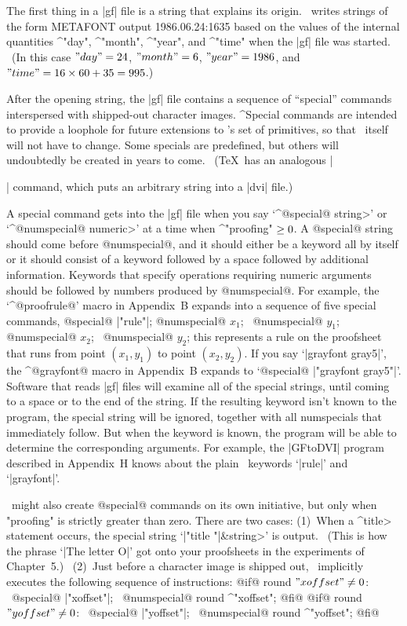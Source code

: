 \smallskip
The first thing in a |gf| file is a string that explains its origin.
\MF\ writes strings of the form
\begintt
METAFONT output 1986.06.24:1635
\endtt
based on the values of the internal quantities ^"day", ^"month",
^"year", and ^"time" when the |gf| file was started. \ (In this case
$"day"=24$, $"month"=6$, $"year"=1986$, %
and $"time"=16\times60+35=995$.)

After the opening string, the |gf| file contains a sequence of
``special'' commands interspersed with shipped-out character images.
^{Special commands} are intended to provide a loophole for future
extensions to \MF's set of primitives, so that \MF\ itself will not
have to change. Some specials are predefined, but others will
undoubtedly be created in years to come. \ (\TeX\ has an analogous
|\special| command, which puts an arbitrary string into a |dvi| file.)

A special command gets into the |gf| file when you say `^@special@
\<string>' or `^@numspecial@ \<numeric>' at a time when
^"proofing"$\null\ge0$.  A @special@ string should come before
@numspecial@, and it
should either be a keyword all by itself or it should consist of a keyword
followed by a space followed by additional information. Keywords that
specify operations requiring numeric arguments should be followed by
numbers produced by @numspecial@. For example, the `^@proofrule@' macro
in Appendix~B expands into a sequence of five special commands,
\begindisplay
@special@ |"rule"|;\cr
@numspecial@ $x_1$; \ @numspecial@ $y_1$;\cr
@numspecial@ $x_2$; \ @numspecial@ $y_2$;\cr
\enddisplay
this represents a rule on the proofsheet that runs from point $(x_1,y_1)$
to point $(x_2,y_2)$. If you say `|grayfont gray5|', the ^@grayfont@
macro in Appendix~B expands to `@special@ |"grayfont gray5"|'.
Software that reads |gf| files will examine all of the special strings,
until coming to a space or to the end of the string. If the resulting
keyword isn't known to the program, the special string will be ignored,
together with all numspecials that immediately follow. But when the
keyword is known, the program will be able to determine the corresponding
arguments.  For example, the |GFtoDVI| program described in Appendix~H
knows about the plain \MF\ keywords `|rule|' and `|grayfont|'.

\MF\ might also create @special@ commands on its own initiative, but only
when "proofing" is strictly greater than zero. There are
two cases: (1)~When a ^\<title> statement occurs,
the special string `|"title "|\thinspace\&\thinspace\<string>'
is output. \ (This is how the phrase `|The letter O|' got onto your
proofsheets in the experiments of Chapter~5.) \ (2)~Just before a
character image is shipped out, \MF\ implicitly executes the following
sequence of instructions:
\begindisplay
@if@ round $"xoffset"\ne0$: \ @special@ |"xoffset"|; \
 @numspecial@ round ^"xoffset"; @fi@\cr
@if@ round $"yoffset"\ne0$: \ @special@ |"yoffset"|; \
 @numspecial@ round ^"yoffset"; @fi@\cr
\enddisplay

